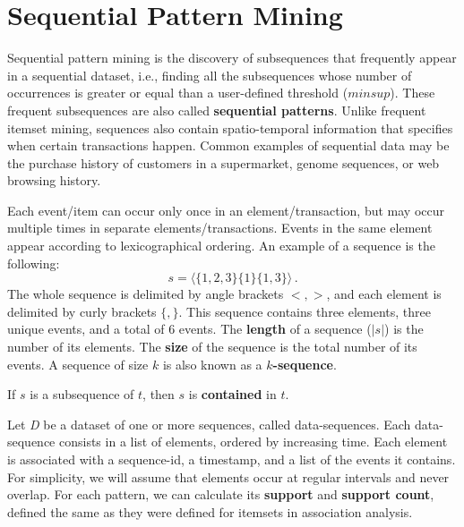\chapter{Sequential Pattern Mining}

Sequential pattern mining is the discovery of subsequences that frequently appear in a sequential dataset, i.e., finding all the subsequences whose number of occurrences is greater or equal than a user-defined threshold ($minsup$). These frequent subsequences are also called \textbf{sequential patterns}. Unlike frequent itemset mining, sequences also contain spatio-temporal information that specifies when certain transactions happen. Common examples of sequential data may be the purchase history of customers in a supermarket, genome sequences, or web browsing history. 

Each event/item can occur only once in an element/transaction, but may occur multiple times in separate elements/transactions. Events in the same element appear according to lexicographical ordering. An example of a sequence is the following:
\begin{equation*}
    s = \langle \{1, 2, 3\} \{1\} \{1, 3\} \rangle \,.
\end{equation*}
The whole sequence is delimited by angle brackets $<,>$, and each element is delimited by curly brackets $\{,\}$.
This sequence contains three elements, three unique events, and a total of 6 events.
The \textbf{length} of a sequence ($|s|$) is the number of its elements. The \textbf{size} of the sequence is the total number of its events. A sequence of size $k$ is also known as a \textbf{$k$-sequence}.

If $s$ is a subsequence of $t$, then $s$ is \textbf{contained} in $t$.

Let \textit{D} be a dataset of one or more sequences, called data-sequences. Each data-sequence consists in a list of elements, ordered by increasing time. Each element is associated with a sequence-id, a timestamp, and a list of the events it contains. For simplicity, we will assume that elements occur at regular intervals and never overlap. For each pattern, we can calculate its \textbf{support} and \textbf{support count}, defined the same as they were defined for itemsets in association analysis.

